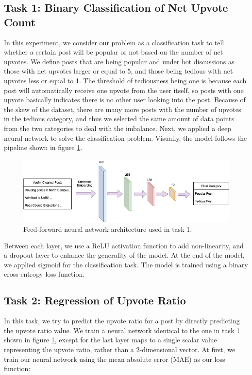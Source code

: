\documentclass[11pt,a4paper]{article}
\let\Oldsubsection\subsection
\renewcommand{\subsection}{\FloatBarrier\Oldsubsection}
\begin{document}
    \Oldsubsection{Task 1: Binary Classification of Net Upvote Count}
    In this experiment, we consider our problem as a classification task to tell whether a certain post will be popular or not based on the number of net upvotes. We define posts that are being popular and under hot discussions as those with net upvotes larger or equal to 5, and those being tedious with net upvotes less or equal to 1. The threshold of tediousness being one is because each post will automatically receive one upvote from the user itself, so posts with one upvote basically indicates there is no other user looking into the post. Because of the skew of the dataset, there are many more posts with the number of upvotes in the tedious category, and thus we selected the same amount of data points from the two categories to deal with the imbalance. 
    Next, we applied a deep neural network to solve the classification problem. Visually, the model follows the pipeline shown in figure \ref{fig:nnet}.

    \begin{figure}
        \includegraphics[width=\textwidth]{nnet.png}
        \caption{Feed-forward neural network architecture used in task 1.}
        \label{fig:nnet}
    \end{figure}
    
    Between each layer, we use a ReLU activation function to add non-linearity, and a dropout layer to enhance the generality of the model. At the end of the model, we applied sigmoid for the classification task. The model is trained using a binary cross-entropy loss function.

    \Oldsubsection{Task 2: Regression of Upvote Ratio}
    In this task, we try to predict the upvote ratio for a post by directly predicting the upvote ratio value. We train a neural network identical to the one in task 1 shown in figure \ref{fig:nnet}, except for the last layer maps to a single scalar value representing the upvote ratio, rather than a 2-dimensional vector. At first, we train our neural network using the mean absolute error (MAE) as our loss function:
\end{document}
